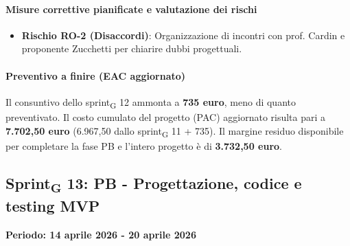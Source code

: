 \documentclass[11pt,a4paper]{article}
\newcommand{\gls}[1]{#1\textsubscript{G}}
\begin{document}
\paragraph{Misure correttive pianificate e valutazione dei rischi}
\begin{itemize}
    \item \textbf{Rischio RO-2 (Disaccordi)}: Organizzazione di incontri con prof. Cardin e proponente Zucchetti per chiarire dubbi progettuali.
\end{itemize}

\paragraph{Preventivo a finire (EAC aggiornato)}
Il consuntivo dello \gls{sprint} 12 ammonta a \textbf{735 euro}, meno di quanto preventivato.
Il costo cumulato del progetto (PAC) aggiornato risulta pari a \textbf{7.702,50 euro} (6.967,50 dallo \gls{sprint} 11 + 735). 
Il margine residuo disponibile per completare la fase PB e l'intero progetto è di \textbf{3.732,50 euro}.

\newpage

\subsection{\gls{Sprint} 13: PB - Progettazione, codice e testing MVP}
{\textbf{Periodo: 14 aprile 2026 - 20 aprile 2026}\par}
\end{document}
